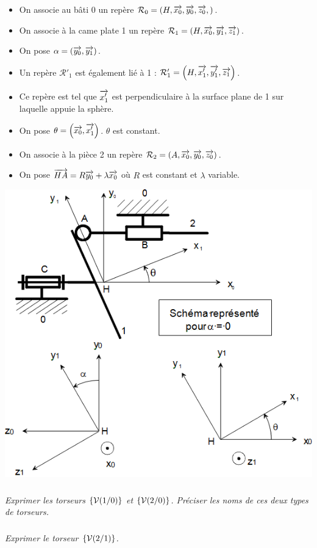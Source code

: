 \documentclass[10pt,oneside]{article}
\begin{document}
\begin{itemize}
\item On associe au bâti 0 un repère $\mathcal{R}_0=\left(H,\overrightarrow{x_0},\overrightarrow{y_0},\overrightarrow{z_0}, \right)$.
\item On associe à la came plate 1 un repère  $\mathcal{R}_1=\left(H,\overrightarrow{x_0},\overrightarrow{y_1},\overrightarrow{z_1} \right)$. 
\item On pose  $\alpha=\left( \overrightarrow{y_0}, \overrightarrow{y_1}\right)$.
\item Un repère $\mathcal{R}'_1$ est également lié à 1 : $\mathcal{R}'_1=\left(H,\overrightarrow{x'_1},\overrightarrow{y'_1},\overrightarrow{z_1} \right)$. 
\item Ce repère est tel que $\overrightarrow{x'_1}$ est perpendiculaire à la surface plane de 1 sur laquelle appuie la sphère.
\item On pose $\theta= \left( \overrightarrow{x_0}, \overrightarrow{x'_1}\right)$. $\theta$ est constant.
\item On associe à la pièce 2 un repère  $\mathcal{R}_2=\left(A,\overrightarrow{x_0},\overrightarrow{y_0},\overrightarrow{z_0} \right)$. 
\item On pose $\overrightarrow{HA}=R\overrightarrow{y_0}+\lambda\overrightarrow{x_0}$ où $R$ est constant et $\lambda$ variable.
\end{itemize}

\begin{center}
\includegraphics[width=.6\textwidth]{png/fig_01}
\end{center}

\subparagraph{}
\textit{Exprimer les torseurs $\left\{{\mathcal{V}(1/0)}\right\}$ et $\left\{{\mathcal{V}(2/0)}\right\}$. Préciser les noms de ces deux types de torseurs.}

\subparagraph{}
\textit{Exprimer le torseur $\left\{{\mathcal{V}(2/1)}\right\}$.}
\end{document}
